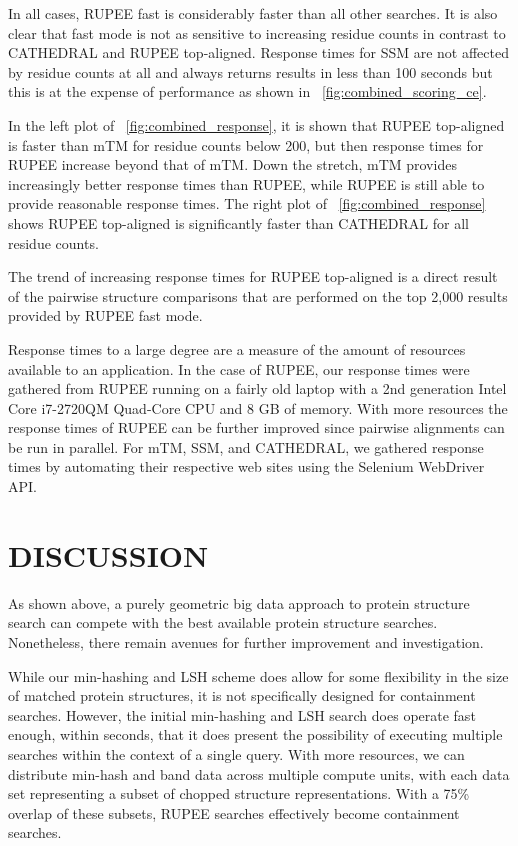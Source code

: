 \documentclass[letter,center,fleqn]{NAR}
\begin{document}
In all cases, RUPEE fast is considerably faster than all other searches. 
It is also clear that fast mode is not as sensitive to increasing residue counts in contrast to CATHEDRAL and RUPEE top-aligned.
Response times for SSM are not affected by residue counts at all and always returns results in less than 100 seconds but this is at the expense of performance as shown in \figurename~\ref{fig:combined_scoring_ce}.

In the left plot of \figurename~\ref{fig:combined_response}, it is shown that RUPEE top-aligned is faster than mTM for residue counts below 200, but then response times for RUPEE increase beyond that of mTM. 
Down the stretch, mTM provides increasingly better response times than RUPEE, while RUPEE is still able to provide reasonable response times. 
The right plot of \figurename~\ref{fig:combined_response} shows RUPEE top-aligned is significantly faster than CATHEDRAL for all residue counts. 

The trend of increasing response times for RUPEE top-aligned is a direct result of the pairwise structure comparisons that are performed on the top 2,000 results provided by RUPEE fast mode.

Response times to a large degree are a measure of the amount of resources available to an application. 
In the case of RUPEE, our response times were gathered from RUPEE running on a fairly old laptop with a 2nd generation Intel\textregistered{} Core\texttrademark{} i7-2720QM Quad-Core CPU and 8 GB of memory. 
With more resources the response times of RUPEE can be further improved since pairwise alignments can be run in parallel. 
For mTM, SSM, and CATHEDRAL, we gathered response times by automating their respective web sites using the Selenium WebDriver API. 

\section{DISCUSSION}

As shown above, a purely geometric big data approach to protein structure search can compete with the best available protein structure searches.
Nonetheless, there remain avenues for further improvement and investigation. 

While our min-hashing and LSH scheme does allow for some flexibility in the size of matched protein structures, it is not specifically designed for containment searches. 
However, the initial min-hashing and LSH search does operate fast enough, within seconds, that it does present the possibility of executing multiple searches within the context of a single query. 
With more resources, we can distribute min-hash and band data across multiple compute units, with each data set representing a subset of chopped structure representations. 
With a 75\% overlap of these subsets, RUPEE searches effectively become containment searches. 
\end{document}

